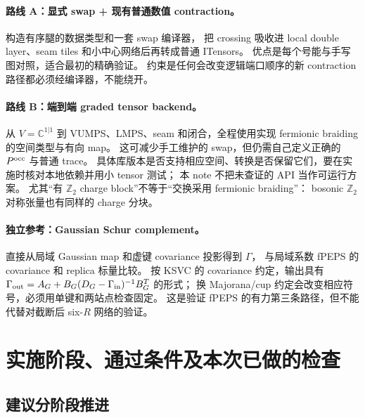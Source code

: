 \documentclass[11pt]{article}
\begin{document}
\paragraph{路线 A：显式 swap + 现有普通数值 contraction。}
构造有序腿的数据类型和一套 swap 编译器，
把 crossing 吸收进 local double layer、seam tiles 和小中心网络后再转成普通 ITensors。
优点是每个号能与手写图对照，适合最初的精确验证。
约束是任何会改变逻辑端口顺序的新 contraction 路径都必须经编译器，不能绕开。

\paragraph{路线 B：端到端 graded tensor backend。}
从 $V=\mathbb C^{1|1}$ 到 VUMPS、LMPS、seam 和闭合，全程使用实现 fermionic braiding 的空间类型与有向 map。
这可减少手工维护的 swap，但仍需自己定义正确的 $P^{\rm occ}$ 与普通 trace。
具体库版本是否支持相应空间、转换是否保留它们，要在实施时核对本地依赖并用小 tensor 测试；
本 note 不把未查证的 API 当作可运行方案。
尤其“有 $\mathbb Z_2$ charge block”不等于“交换采用 fermionic braiding”：
bosonic $\mathbb Z_2$ 对称张量也有同样的 charge 分块。

\paragraph{独立参考：Gaussian Schur complement。}
直接从局域 Gaussian map 和虚键 covariance 投影得到 $\Gamma$，
与局域系数 fPEPS 的 covariance 和 replica 标量比较。
按 KSVC 的 covariance 约定，输出具有
$\Gamma_{\rm out}=A_G+B_G(D_G-\Gamma_{\rm in})^{-1}B_G^T$ 的形式；
换 Majorana/cup 约定会改变相应符号，必须用单键和两站点检查固定。
这是验证 fPEPS 的有力第三条路径，但不能代替对截断后 six-$R$ 网络的验证。

\section{实施阶段、通过条件及本次已做的检查}
\subsection{建议分阶段推进}
\end{document}
